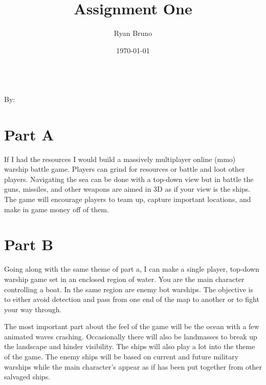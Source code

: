 \documentclass{article}
\title{Assignment One}
\author{Ryan Bruno}
\date{\today}
\renewcommand{\maketitle}{
    \textbf{\thetitle} \\
    By: \theauthor \\
    \thedate
}
\begin{document}
\maketitle

\section*{Part A}

If I had the resources I would build a massively multiplayer online (mmo) warship battle game.
Players can grind for resources or battle and loot other players.
Navigating the sea can be done with a top-down view but in battle the guns, missiles, and other weapons are aimed in 3D as if your view is the ships.
The game will encourage players to team up, capture important locations, and make in game money off of them.

\section*{Part B}

Going along with the same theme of part a, I can make a single player, top-down warship game set in an enclosed region of water.
You are the main character controlling a boat.
In the same region are enemy bot warships.
The objective is to either avoid detection and pass from one end of the map to another or to fight your way through.

The most important part about the feel of the game will be the ocean with a few animated waves crashing.
Occasionally there will also be landmasses to break up the landscape and hinder visibility.
The ships will also play a lot into the theme of the game.
The enemy ships will be based on current and future military warships while the main character's appear as if has been put together from other salvaged ships.
\end{document}
